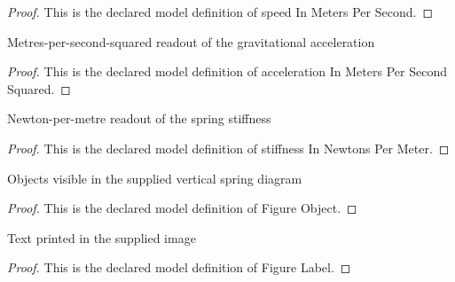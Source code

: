 \begin{proof}
  This is the declared model definition of speed In Meters Per Second.
\end{proof}
\begin{definition}
  \label{def:physics:phyx-mini-0765:phyxminiproblems-problemphyxmini0765-accelerationinmeterspersecondsquared}
  Metres-per-second-squared readout of the gravitational acceleration
\end{definition}
\begin{proof}
  This is the declared model definition of acceleration In Meters Per Second Squared.
\end{proof}
\begin{definition}
  \label{def:physics:phyx-mini-0765:phyxminiproblems-problemphyxmini0765-stiffnessinnewtonspermeter}
  Newton-per-metre readout of the spring stiffness
\end{definition}
\begin{proof}
  This is the declared model definition of stiffness In Newtons Per Meter.
\end{proof}
\begin{definition}
  \label{def:physics:phyx-mini-0765:phyxminiproblems-problemphyxmini0765-figureobject}
  Objects visible in the supplied vertical spring diagram
\end{definition}
\begin{proof}
  This is the declared model definition of Figure Object.
\end{proof}
\begin{definition}
  \label{def:physics:phyx-mini-0765:phyxminiproblems-problemphyxmini0765-figurelabel}
  Text printed in the supplied image
\end{definition}
\begin{proof}
  This is the declared model definition of Figure Label.
\end{proof}

